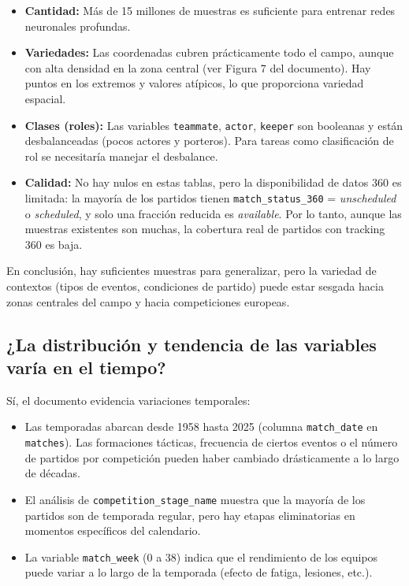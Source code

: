 \documentclass[12pt,a4paper]{article}
\begin{document}
\begin{itemize}
    \item \textbf{Cantidad:} Más de 15 millones de muestras es suficiente para entrenar redes neuronales profundas.
    \item \textbf{Variedades:} Las coordenadas cubren prácticamente todo el campo, aunque con alta densidad en la zona central (ver Figura 7 del documento). Hay puntos en los extremos y valores atípicos, lo que proporciona variedad espacial.
    \item \textbf{Clases (roles):} Las variables \texttt{teammate}, \texttt{actor}, \texttt{keeper} son booleanas y están desbalanceadas (pocos actores y porteros). Para tareas como clasificación de rol se necesitaría manejar el desbalance.
    \item \textbf{Calidad:} No hay nulos en estas tablas, pero la disponibilidad de datos 360 es limitada: la mayoría de los partidos tienen \texttt{match\_status\_360} = \emph{unscheduled} o \emph{scheduled}, y solo una fracción reducida es \emph{available}. Por lo tanto, aunque las muestras existentes son muchas, la cobertura real de partidos con tracking 360 es baja.
\end{itemize}

En conclusión, hay suficientes muestras para generalizar, pero la variedad de contextos (tipos de eventos, condiciones de partido) puede estar sesgada hacia zonas centrales del campo y hacia competiciones europeas.

\subsection{¿La distribución y tendencia de las variables varía en el tiempo?}

Sí, el documento evidencia variaciones temporales:

\begin{itemize}
    \item Las temporadas abarcan desde 1958 hasta 2025 (columna \texttt{match\_date} en \texttt{matches}). Las formaciones tácticas, frecuencia de ciertos eventos o el número de partidos por competición pueden haber cambiado drásticamente a lo largo de décadas.
    \item El análisis de \texttt{competition\_stage\_name} muestra que la mayoría de los partidos son de temporada regular, pero hay etapas eliminatorias en momentos específicos del calendario.
    \item La variable \texttt{match\_week} (0 a 38) indica que el rendimiento de los equipos puede variar a lo largo de la temporada (efecto de fatiga, lesiones, etc.).
\end{itemize}
\end{document}
